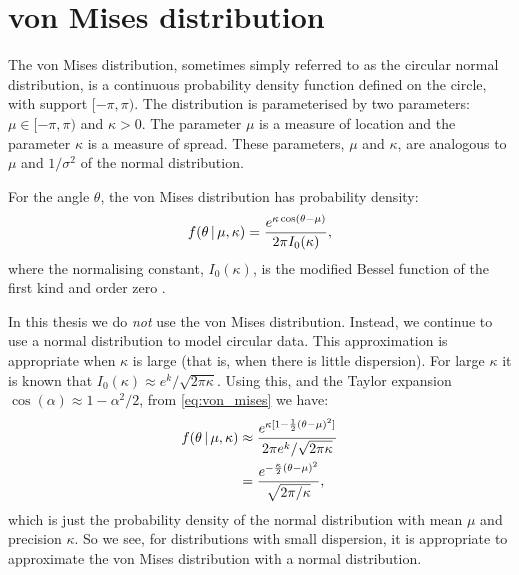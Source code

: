 \section{von Mises distribution}

The von Mises distribution, sometimes simply referred to as the circular normal
distribution, is a continuous probability density function defined on the
circle, with support $[-\pi, \pi)$. The distribution is parameterised by two
parameters: $\mu \in [-\pi, \pi)$ and $\kappa > 0$. The parameter $\mu$ is a
measure of location and the parameter $\kappa$ is a measure of spread. These
parameters, $\mu$ and $\kappa$, are analogous to $\mu$ and $1/\sigma^2$ of the
normal distribution.

For the angle $\theta$, the von Mises distribution has probability density:
\begin{equation}
    \label{eq:von_mises}
	f(\theta \given \mu, \kappa) = \frac{e^{\kappa \cos(\theta - \mu)}}%
	                                    {2 \pi I_0(\kappa)},
\end{equation}
where the normalising constant, $I_0(\kappa)$, is the modified Bessel function
of the first kind and order zero \parencite{jammalamadaka01}.

In this thesis we do \emph{not} use the von Mises distribution. Instead, we
continue to use a normal distribution to model circular data. This
approximation is appropriate when $\kappa$ is large (that is, when there is
little dispersion). For large $\kappa$ it is known that $I_0(\kappa) \approx
e^k / \sqrt{2\pi\kappa}$. Using this, and the Taylor expansion $\cos(\alpha)
\approx 1 - \alpha^2/2$, from \cref{eq:von_mises} we have:
\begin{align*}
    f(\theta \given \mu, \kappa) &\approx \frac{e^{\kappa[1-\frac{1}{2}(\theta-\mu)^2]}}%
                                               {2\pi e^k / \sqrt{2\pi\kappa}}\\
                                 & = \frac{e^{-\frac{\kappa}{2}(\theta-\mu)^2}}%
                                          {\sqrt{2\pi/\kappa}},
\end{align*}
which is just the probability density of the normal distribution with mean
$\mu$ and precision $\kappa$. So we see, for distributions with small
dispersion, it is appropriate to approximate the von Mises distribution with a
normal distribution.

